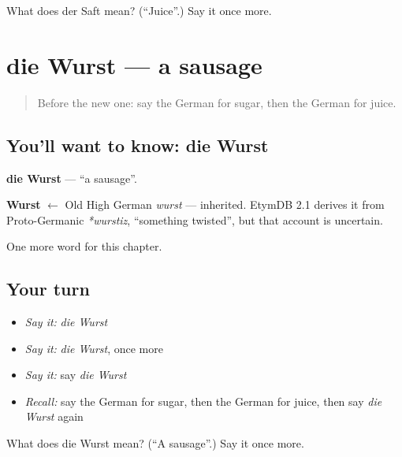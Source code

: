 \begin{tcolorbox}[breakable,colback=teal!4,colframe=teal!35!black,title={Before you move on}]
What does der Saft mean? (\textquotedblleft{}Juice\textquotedblright{}.) Say it once more.
\end{tcolorbox}
\section[die Wurst]{die Wurst — a sausage}

\label{lesson:GE-C74-wurst}



\begin{quote}
Before the new one: say the German for sugar, then the German for juice.
\end{quote}

\subsection*{You'll want to know: die Wurst}
\textbf{die Wurst} — \textquotedblleft{}a sausage\textquotedblright{}.

\begin{cousinweb}
\textbf{Wurst} $\leftarrow$ Old High German \emph{wurst} — inherited. EtymDB 2.1 derives it from Proto-Germanic \emph{*wurstiz}, \textquotedblleft{}something twisted\textquotedblright{}, but that account is uncertain.
\end{cousinweb}

\begin{grammarlens}[title={What you've built}]
One more word for this chapter.
\end{grammarlens}

\subsection*{Your turn}
\begin{itemize}
\raggedright
  \item \emph{Say it:} \emph{die Wurst}
  \item \emph{Say it:} \emph{die Wurst}, once more
  \item \emph{Say it:} say \emph{die Wurst}
  \item \emph{Recall:} say the German for sugar, then the German for juice, then say \emph{die Wurst} again
\end{itemize}

\begin{tcolorbox}[breakable,colback=teal!4,colframe=teal!35!black,title={Before you move on}]
What does die Wurst mean? (\textquotedblleft{}A sausage\textquotedblright{}.) Say it once more.
\end{tcolorbox}
